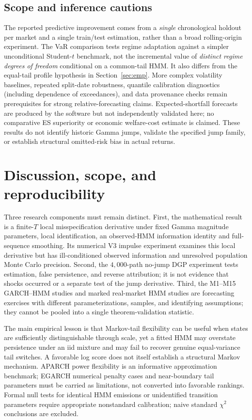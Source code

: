 \documentclass[11pt,a4paper]{article}
\begin{document}
\subsection{Scope and inference cautions}
The reported predictive improvement comes from a \emph{single} chronological holdout per market and a single train/test estimation, rather than a broad rolling-origin experiment. The VaR comparison tests regime adaptation against a simpler unconditional Student-$t$ benchmark, not the incremental value of \emph{distinct regime degrees of freedom} conditional on a common-tail HMM. It also differs from the equal-tail profile hypothesis in Section~\ref{sec:emp}. More complex volatility baselines, repeated split-date robustness, quantile calibration diagnostics (including dependence of exceedances), and data provenance checks remain prerequisites for strong relative-forecasting claims. Expected-shortfall forecasts are produced by the software but not independently validated here; no comparative ES superiority or economic welfare-cost estimate is claimed. These results do not identify historic Gamma jumps, validate the specified jump family, or establish structural omitted-risk bias in actual returns.

\section{Discussion, scope, and reproducibility}\label{sec:discussion}
Three research components must remain distinct. First, the mathematical result is a finite-$T$ local misspecification derivative under fixed Gamma magnitude parameters, local identification, an observed-HMM information identity and full-sequence smoothing. Its numerical V3 impulse experiment examines this local derivative but has ill-conditioned observed information and unresolved population Monte Carlo precision. Second, the $4{,}000$-path no-jump DGP experiment tests estimation, false persistence, and reverse attribution; it is not evidence that shocks occurred or a separate test of the jump derivative. Third, the M1--M15 GARCH--HMM studies and marked real-market HMM studies are forecasting exercises with different parameterizations, samples, and identifying assumptions; they cannot be pooled into a single theorem-validation statistic.

The main empirical lesson is that Markov-tail flexibility can be useful when states are sufficiently distinguishable through scale, yet a fitted HMM may overstate persistence under an iid mixture and may fail to recover genuine equal-variance tail switches. A favorable log score does not itself establish a structural Markov mechanism. APARCH power flexibility is an informative approximation benchmark; EGARCH numerical penalty cases and near-boundary tail parameters must be carried as limitations, not converted into favorable rankings. Formal null tests for identical HMM emissions or unidentified transition parameters require appropriate nonstandard calibration; naive standard $\chi^2$ conclusions are excluded.
\end{document}
